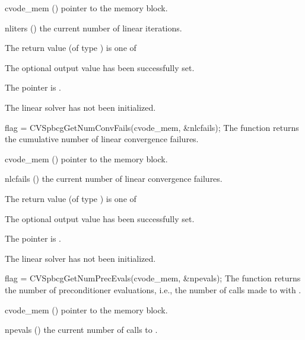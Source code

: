 {
  \begin{args}
  \item[cvode\_mem] ()
    pointer to the {\cvode} memory block.
  \item[nliters] ()
    the current number of linear iterations.
  \end{args}
}
{
  The return value  (of type ) is one of
  \begin{args}
  \item[\Id{CVSPBCG\_SUCCESS}] 
    The optional output value has been successfully set.
  \item[\Id{CVSPBCG\_MEM\_NULL}]
    The  pointer is .
  \item[\Id{CVSPBCG\_LMEM\_NULL}]
    The {\cvspbcg} linear solver has not been initialized.
  \end{args}
}
{}
{
  flag = CVSpbcgGetNumConvFails(cvode\_mem, \&nlcfails);
}
{
  The function  returns the
  cumulative number of linear convergence failures.
}
{
  \begin{args}
  \item[cvode\_mem] ()
    pointer to the {\cvode} memory block.
  \item[nlcfails] ()
    the current number of linear convergence failures.
  \end{args}
}
{
  The return value  (of type ) is one of
  \begin{args}
  \item[\Id{CVSPBCG\_SUCCESS}] 
    The optional output value has been successfully set.
  \item[\Id{CVSPBCG\_MEM\_NULL}]
    The  pointer is .
  \item[\Id{CVSPBCG\_LMEM\_NULL}]
    The {\cvspbcg} linear solver has not been initialized.
  \end{args}
}
{}
{
  flag = CVSpbcgGetNumPrecEvals(cvode\_mem, \&npevals);
}
{
  The function  returns the
  number of preconditioner evaluations, i.e., the number of 
  calls made to  with .
}
{
  \begin{args}
  \item[cvode\_mem] ()
    pointer to the {\cvode} memory block.
  \item[npevals] ()
    the current number of calls to .
  \end{args}
}
